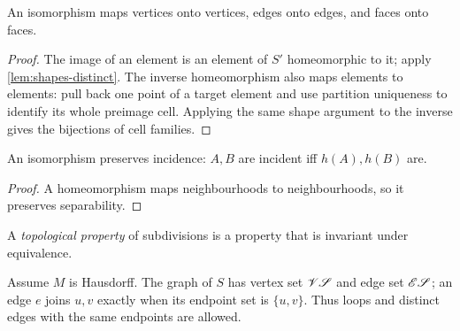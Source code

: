     \begin{lemma}\label{lem:iso-preserves-type}

      An isomorphism maps vertices onto vertices, edges onto edges, and faces
      onto faces.
    \end{lemma}
    \begin{proof}

      The image of an element is an element of $S'$ homeomorphic to it; apply
      \cref{lem:shapes-distinct}. The inverse homeomorphism also maps elements
      to elements: pull back one point of a target element and use partition
      uniqueness to identify its whole preimage cell. Applying the same
      shape argument to the inverse gives the bijections of cell families.
    \end{proof}

    \begin{lemma}\label{lem:iso-preserves-incidence}

      An isomorphism preserves incidence: $A, B$ are incident iff $h(A), h(B)$
      are.
    \end{lemma}
    \begin{proof}

      A homeomorphism maps neighbourhoods to neighbourhoods, so it preserves
      separability.
    \end{proof}

    \begin{definition}\label{def:topological-property}

      A \emph{topological property} of subdivisions is a property that is
      invariant under equivalence.
    \end{definition}

    \begin{definition}\label{def:graph}

      Assume $M$ is Hausdorff. The graph of $S$ has vertex set $\mathscr{V}\mathscr{S}$ and
      edge set $\mathscr{E}\mathscr{S}$; an edge $e$ joins $u,v$ exactly when its endpoint set is
      $\{u,v\}$. Thus loops and distinct edges with the same endpoints are allowed.
    \end{definition}

